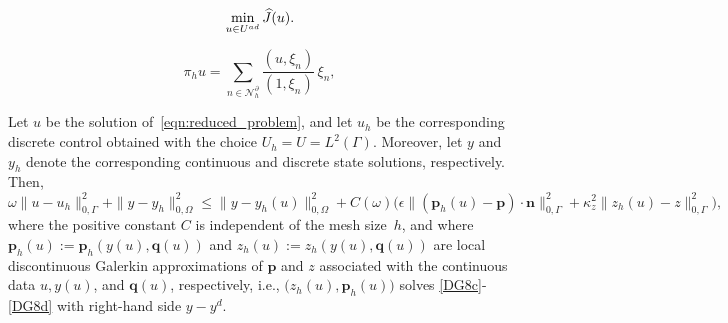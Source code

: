 \documentclass[10pt,a4paper]{amsart}
\newcommand{\Uad}{{U^{\textup{ad}}}}
\newcommand{\bn}{{\mathbf{n}}}
\newcommand{\bp}{{\mathbf{p}}}
\newcommand{\bq}{{\mathbf{q}}}
\begin{document}
\begin{equation}\label{eqn:reduced_problem}
    \min_{u \in \Uad} \widehat J(u).
\end{equation}

\begin{equation}\label{def:quasi_interpolation}
    \pi_h u = \sum_{n \in \mathcal{N}_h^\partial} \frac{(u, \xi_n)}{(1, \xi_n)} \, \xi_n,
\end{equation}

\begin{theorem}\label{thm:nodisc_adjoint_representation}
Let $u$ be the solution of~\eqref{eqn:reduced_problem}, and let 
$u_h$ be the corresponding discrete control obtained with the choice $U_h = U = L^2(\Gamma)$. 
Moreover, let $y$ and $y_h$ denote the corresponding continuous and discrete state solutions, respectively. 
Then, 
\begin{equation}\label{vge}
    \omega \| u - u_h \|_{0,\Gamma}^2  + \|y-y_h\|_{0,\Omega}^2 \le \|y-y_h(u)\|_{0,\Omega}^2 + C(\omega) 
     \big( \epsilon \|(\bp_h(u) - \bp)\cdot\bn\|_{0,\Gamma}^2 
         + \kappa_z^2\|z_h(u) - z\|_{0,\Gamma}^2 \big),
\end{equation}
where the positive constant $C$ is independent of the mesh size~$h$, and where $\bp_h(u):=\bp_h(y(u),\bq(u))$ and $z_h(u):=z_h(y(u),\bq(u))$ are local discontinuous Galerkin approximations of $\bp$ and $z$ associated with the continuous data $u, y(u)$, and $\bq(u)$, respectively, i.e., $\big(z_h(u),\bp_h(u)\big)$ solves \eqref{DG8c}-\eqref{DG8d} with right-hand side $y-y^d$.

\end{theorem}
\end{document}
